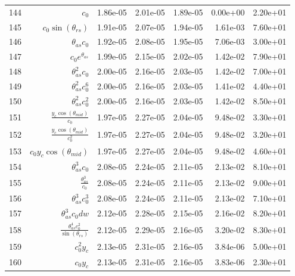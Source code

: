 \begin{tabularx}{\textwidth}{lRRRRRl}
144  &  $ c_{0} $  &  1.86e-05  &  2.01e-05  &  1.89e-05  &  0.00e+00  &  2.20e+01  \\ 
145  &  $ c_{0} \sin{\left(\theta_{rs} \right)} $  &  1.91e-05  &  2.07e-05  &  1.94e-05  &  1.61e-03  &  7.60e+01  \\ 
146  &  $ \theta_{as} c_{0} $  &  1.92e-05  &  2.08e-05  &  1.95e-05  &  7.06e-03  &  3.00e+01  \\ 
147  &  $ c_{0} e^{\theta_{as}} $  &  1.99e-05  &  2.15e-05  &  2.02e-05  &  1.42e-02  &  7.90e+01  \\ 
148  &  $ \theta_{as}^{2} c_{0} $  &  2.00e-05  &  2.16e-05  &  2.03e-05  &  1.42e-02  &  7.00e+01  \\ 
149  &  $ \theta_{as}^{2} c_{0}^{6} $  &  2.00e-05  &  2.16e-05  &  2.03e-05  &  1.41e-02  &  4.40e+01  \\ 
150  &  $ \theta_{as}^{2} c_{0}^{2} $  &  2.00e-05  &  2.16e-05  &  2.03e-05  &  1.42e-02  &  8.50e+01  \\ 
151  &  $ \displaystyle\frac{y_c \cos{\left(\theta_{mid} \right)}}{c_{0}} $  &  1.97e-05  &  2.27e-05  &  2.04e-05  &  9.48e-02  &  3.30e+01  \\ 
152  &  $ \displaystyle\frac{y_c \cos{\left(\theta_{mid} \right)}}{c_{0}^{2}} $  &  1.97e-05  &  2.27e-05  &  2.04e-05  &  9.48e-02  &  3.20e+01  \\ 
153  &  $ c_{0} y_c \cos{\left(\theta_{mid} \right)} $  &  1.97e-05  &  2.27e-05  &  2.04e-05  &  9.48e-02  &  4.60e+01  \\ 
154  &  $ \theta_{as}^{3} c_{0} $  &  2.08e-05  &  2.24e-05  &  2.11e-05  &  2.13e-02  &  8.10e+01  \\ 
155  &  $ \displaystyle\frac{\theta_{as}^{3}}{c_{0}} $  &  2.08e-05  &  2.24e-05  &  2.11e-05  &  2.13e-02  &  9.00e+01  \\ 
156  &  $ \theta_{as}^{3} c_{0}^{3} $  &  2.08e-05  &  2.24e-05  &  2.11e-05  &  2.13e-02  &  7.10e+01  \\ 
157  &  $ \theta_{as}^{3} c_{0} d w $  &  2.12e-05  &  2.28e-05  &  2.15e-05  &  2.16e-02  &  8.20e+01  \\ 
158  &  $ \displaystyle\frac{\theta_{as}^{4} c_{0}^{2}}{\sin{\left(\theta_{rs} \right)}} $  &  2.12e-05  &  2.29e-05  &  2.16e-05  &  3.20e-02  &  8.30e+01  \\ 
159  &  $ c_{0}^{2} y_c $  &  2.13e-05  &  2.31e-05  &  2.16e-05  &  3.84e-06  &  5.00e+01  \\ 
160  &  $ c_{0} y_c $  &  2.13e-05  &  2.31e-05  &  2.16e-05  &  3.83e-06  &  2.30e+01  \\ 

\end{tabularx}
